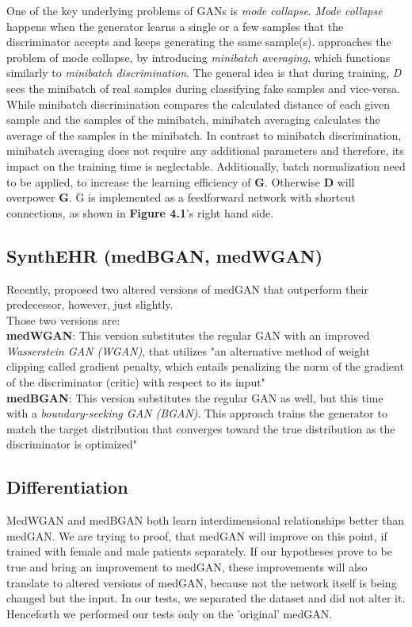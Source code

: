 \documentclass[11pt, a4paper, oneside]{book}
\begin{document}
One of the key underlying problems of GANs is \textit{mode collapse}. \textit{Mode collapse} happens when the generator learns a single or a few samples that the discriminator accepts and keeps generating the same sample(s).
\citep{Choi2017} approaches the problem of mode collapse, by introducing \textit{minibatch averaging}, which functions similarly to \textit{minibatch discrimination}. The general idea is that during training, \textit{D} sees the minibatch of real samples during classifying fake samples and vice-versa.
While minibatch discrimination compares the calculated distance of each given sample and the samples of the minibatch, minibatch averaging calculates the average of the samples in the minibatch. In contrast to minibatch discrimination, minibatch averaging does not require any additional parameters and therefore, its impact on the training time is neglectable. \citep{Choi2017}
Additionally, batch normalization need to be applied, to increase the learning efficiency of \textbf{G}. Otherwise \textbf{D} will overpower \textbf{G}. G is implemented as a feedforward network with shortcut connections, as shown in \textbf{Figure 4.1}'s right hand side. \citep{Choi2017} 
\subsection{SynthEHR (medBGAN, medWGAN)}
Recently, \citep{Baowaly2018} proposed two altered versions of medGAN that outperform their predecessor, however, just slightly.
\\
Those two versions are:
\\
\textbf{medWGAN}: This version substitutes the regular GAN with an improved \textit{Wasserstein GAN (WGAN)}, that utilizes "an alternative method of weight clipping called gradient penalty, which entails penalizing the norm of the gradient of the discriminator (critic) with respect to its input" \citep{Baowaly2018}
\\
\textbf{medBGAN}: This version substitutes the regular GAN as well, but this time with a \textit{boundary-seeking GAN (BGAN)}. This approach trains the generator to match the target distribution that converges toward the true distribution as the discriminator is optimized" \citep{Baowaly2018}
\subsection{Differentiation}
MedWGAN and medBGAN both learn interdimensional relationships better than medGAN. We are trying to proof, that medGAN will improve on this point, if trained with female and male patients separately.
If our hypotheses prove to be true and bring an improvement to medGAN, these improvements will also translate to altered versions of medGAN, because not the network itself is being changed but the input. In our tests, we separated the dataset and did not alter it. Henceforth we performed our tests only on the 'original' medGAN. 
\end{document}
